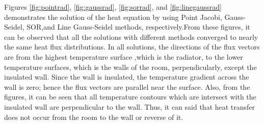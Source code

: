 \documentclass[letterpaper,12pt]{article}
\begin{document}
Figures \ref{fig:pointrad}, \ref{fig:gaussrad}, \ref{fig:sorrad}, and \ref{fig:linegaussrad}
demonstrates the solution of the heat equation by using Point Jacobi, Gauss-Seidel,
 SOR,and Line Gauss-Seidel methods, respectively.From these figures, it can be observed that all the solutions
with different methods converged to nearly the same heat flux distributions.
In all solutions, the directions of the flux vectors are from the highest temperature surface
,which is the radiator, to the lower temperature surfaces, which is the walls of the room,
perpendicularly, except the insulated wall. Since the wall is insulated, the temperature
gradient across the wall is zero; hence the flux vectors are parallel near the surface.
Also, from the figures, it can be seen that all temperature contours which are intersect
with the insulated wall are perpendicular to the wall. Thus, it can said that heat transfer
does not occur from the room to the wall or reverse of it.
\end{document}
